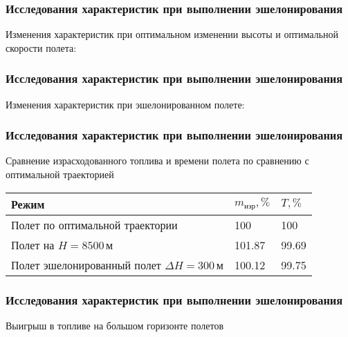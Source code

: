 \documentclass{beamer}
\begin{document}
\begin{frame}[t]
    \frametitle{Исследования характеристик при выполнении эшелонирования}
    \begin{center}
        Изменения характеристик при оптимальном изменении высоты и оптимальной
        скорости полета:

        \begin{minipage}{0.49\textwidth}
            \centering
            \resizebox{1.0\textwidth}{!}{}
        \end{minipage}
        \hfill
        \begin{minipage}{0.49\textwidth}
            \centering
            \resizebox{1.0\textwidth}{!}{}
        \end{minipage}
    \end{center}
\end{frame}

\begin{frame}[t]
    \frametitle{Исследования характеристик при выполнении эшелонирования}
    \begin{center}
        Изменения характеристик при эшелонированном полете: 

        \begin{minipage}{0.49\textwidth}
            \centering
            \resizebox{1.0\textwidth}{!}{}
        \end{minipage}
        \hfill
        \begin{minipage}{0.49\textwidth}
            \centering
            \resizebox{1.0\textwidth}{!}{
            }
        \end{minipage}
    \end{center}
\end{frame}


\begin{frame}[t]
    \frametitle{Исследования характеристик при выполнении эшелонирования}
    \begin{center}

    Сравнение израсходованного топлива и времени полета по сравнению с
    оптимальной траекторией    
\begin{tabular}{|p{}|p{}|p{}|}
    \hline
    Режим & $m_{изр}, \%$ & $T, \%$\\
    \hline
    Полет по оптимальной траектории & 100 & 100 \\
    \hline
    Полет на $H=8500\,м$ & 101.87 & 99.69\\
    \hline
    Полет эшелонированный полет $\Delta H =300\, м$ & 100.12 & 99.75\\
    \hline
\end{tabular}
    \end{center}
\end{frame}

\begin{frame}[t]
    \frametitle{Исследования характеристик при выполнении эшелонирования}
    \begin{center}
        Выигрыш в топливе на большом горизонте полетов
        \resizebox{0.7\textwidth}{!}{}
    \end{center}
\end{frame}
\end{document}
